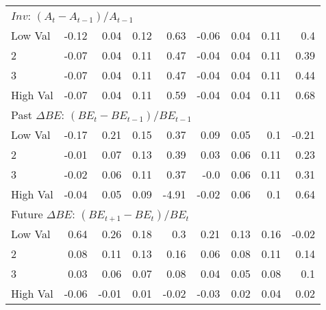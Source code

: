 \begin{table}[ht]
{\begin{tabular}{lrrrrrrrr}
    \multicolumn{9}{l}{$Inv$: $(A_t - A_{t-1}) / A_{t-1}$} \\
    Low Val    & -0.12  & 0.04  & 0.12  & 0.63  & -0.06  & 0.04  & 0.11  & 0.4  \\
           2   & -0.07  & 0.04  & 0.11  & 0.47  & -0.04  & 0.04  & 0.11  & 0.39  \\
           3   & -0.07  & 0.04  & 0.11  & 0.47  & -0.04  & 0.04  & 0.11  & 0.44  \\
    High Val   & -0.07  & 0.04  & 0.11  & 0.59  & -0.04  & 0.04  & 0.11  & 0.68  \\
    [1em]
  

    \multicolumn{9}{l}{Past $\Delta BE$: $(BE_t - BE_{t-1}) / BE_{t-1}$} \\
    Low Val    & -0.17  & 0.21  & 0.15  & 0.37  & 0.09  & 0.05  & 0.1  & -0.21  \\
           2   & -0.01  & 0.07  & 0.13  & 0.39  & 0.03  & 0.06  & 0.11  & 0.23  \\
           3   & -0.02  & 0.06  & 0.11  & 0.37  & -0.0  & 0.06  & 0.11  & 0.31  \\
    High Val   & -0.04  & 0.05  & 0.09  & -4.91  & -0.02  & 0.06  & 0.1  & 0.64  \\
    [1em]
  

    \multicolumn{9}{l}{Future $\Delta BE$: $(BE_{t+1} - BE_t) / BE_t$} \\
    Low Val    & 0.64  & 0.26  & 0.18  & 0.3  & 0.21  & 0.13  & 0.16  & -0.02  \\
           2   & 0.08  & 0.11  & 0.13  & 0.16  & 0.06  & 0.08  & 0.11  & 0.14  \\
           3   & 0.03  & 0.06  & 0.07  & 0.08  & 0.04  & 0.05  & 0.08  & 0.1  \\
    High Val   & -0.06  & -0.01  & 0.01  & -0.02  & -0.03  & 0.02  & 0.04  & 0.02  \\
    [1em]
  

  \bottomrule
\end{tabular}
}
\qquad
{}
\end{table}
